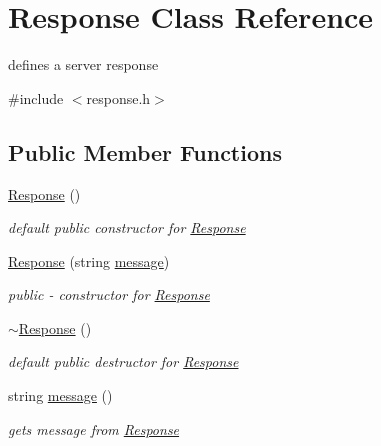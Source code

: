 \hypertarget{classResponse}{}\section{Response Class Reference}
\label{classResponse}


defines a server response  




{\ttfamily \#include $<$response.\+h$>$}

\subsection*{Public Member Functions}
\begin{DoxyCompactItemize}
\item 
\hyperlink{classResponse_aa9b6e391d77fce8daca8bac13730ec8e}{Response} ()\hypertarget{classResponse_aa9b6e391d77fce8daca8bac13730ec8e}{}\label{classResponse_aa9b6e391d77fce8daca8bac13730ec8e}

\begin{DoxyCompactList}\small\item\em default public constructor for \hyperlink{classResponse}{Response} \end{DoxyCompactList}\item 
\hyperlink{classResponse_a1b15763f59777470903b031d9ef53608}{Response} (string \hyperlink{classResponse_a517690400a7b7091d03e917f335f7f28}{message})
\begin{DoxyCompactList}\small\item\em public -\/ constructor for \hyperlink{classResponse}{Response} \end{DoxyCompactList}\item 
\hyperlink{classResponse_a2a4a6403aaefce73725f17cf63896f84}{$\sim$\+Response} ()\hypertarget{classResponse_a2a4a6403aaefce73725f17cf63896f84}{}\label{classResponse_a2a4a6403aaefce73725f17cf63896f84}

\begin{DoxyCompactList}\small\item\em default public destructor for \hyperlink{classResponse}{Response} \end{DoxyCompactList}\item 
string \hyperlink{classResponse_a517690400a7b7091d03e917f335f7f28}{message} ()
\begin{DoxyCompactList}\small\item\em gets message from \hyperlink{classResponse}{Response} \end{DoxyCompactList}\end{DoxyCompactItemize}


